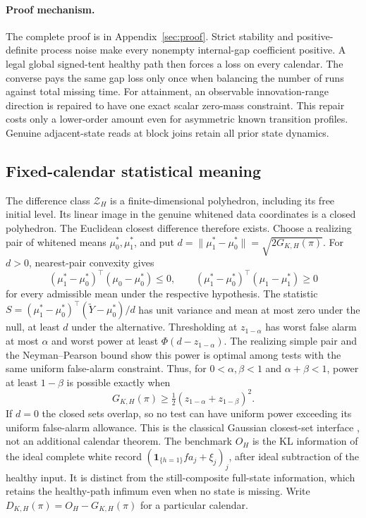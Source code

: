 \documentclass[11pt]{article}
\begin{document}
\paragraph{Proof mechanism.}
The complete proof is in Appendix~\ref{sec:proof}.
Strict stability and positive-definite process noise make every nonempty
internal-gap coefficient positive. A legal global signed-tent healthy path
then forces a loss on every calendar. The converse pays the same gap loss
only once when balancing the number of runs against total missing time.
For attainment, an observable innovation-range direction is repaired to have
one exact scalar zero-mass constraint. This repair costs only a lower-order
amount even for asymmetric known transition profiles. Genuine adjacent-state
reads at block joins retain all prior state dynamics.

\subsection{Fixed-calendar statistical meaning}
The difference class $\mathcal Z_H$ is a finite-dimensional polyhedron, including
its free initial level. Its linear image in the genuine whitened data coordinates
is a closed polyhedron. The Euclidean closest difference therefore exists.
Choose a realizing pair of whitened means $\mu_0^*,\mu_1^*$, and put
$d=\|\mu_1^*-\mu_0^*\|=\sqrt{2G_{K,H}(\pi)}$.
For $d>0$, nearest-pair convexity gives
\[
(\mu_1^*-\mu_0^*)^\top(\mu_0-\mu_0^*)\le0,\qquad
(\mu_1^*-\mu_0^*)^\top(\mu_1-\mu_1^*)\ge0
\]
for every admissible mean under the respective hypothesis.
The statistic
$S=(\mu_1^*-\mu_0^*)^\top(\widetilde Y-\mu_0^*)/d$
has unit variance and mean at most zero under the null, at least $d$ under
the alternative. Thresholding at $z_{1-\alpha}$ has worst false alarm
at most $\alpha$ and worst power at least
$\Phi(d-z_{1-\alpha})$.
The realizing simple pair and the Neyman--Pearson bound show this power is
optimal among tests with the same uniform false-alarm constraint.
Thus, for $0<\alpha,\beta<1$ and $\alpha+\beta<1$, power at least
$1-\beta$ is possible exactly when
\[
G_{K,H}(\pi)\ge\tfrac12(z_{1-\alpha}+z_{1-\beta})^2.
\]
If $d=0$ the closed sets overlap, so no test can have uniform power exceeding
its uniform false-alarm allowance. This is the classical Gaussian closest-set
interface \cite{convex}, not an additional calendar theorem.
The benchmark $O_H$ is the KL information of the ideal complete white record
$(\mathbf1_{\{h=1\}}fa_j+\xi_j)_j$, after ideal subtraction of the healthy input.
It is distinct from the still-composite full-state information, which retains
the healthy-path infimum even when no state is missing.
Write $D_{K,H}(\pi)=O_H-G_{K,H}(\pi)$ for a particular calendar.
\end{document}
